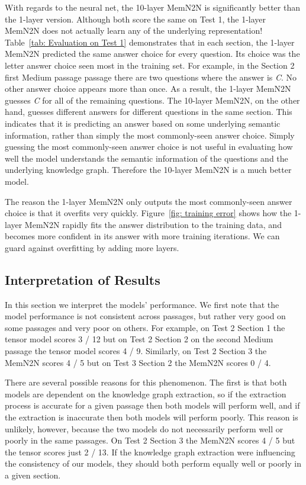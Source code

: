 \documentclass[pageno]{jpaper}
\begin{document}
With regards to the neural net, the 10-layer MemN2N is significantly better than
the 1-layer version. Although both score the same on Test 1, the 1-layer MemN2N
does not actually learn any of the underlying representation! Table~\ref{tab:
Evaluation on Test 1} demonstrates that in each section, the 1-layer MemN2N
predicted the same answer choice for every question. Its choice was the letter
answer choice seen most in the training set. For example, in the Section 2 first
Medium passage passage there are two questions where the answer is \textit{C}.
No other answer choice appears more than once. As a result, the 1-layer MemN2N
guesses \textit{C} for all of the remaining questions. The 10-layer MemN2N, on
the other hand, guesses different answers for different questions in the same
section. This indicates that it is predicting an answer based on some underlying
semantic information, rather than simply the most commonly-seen answer choice.
Simply guessing the most commonly-seen answer choice is not useful in evaluating
how well the model understands the semantic information of the questions and the
underlying knowledge graph. Therefore the 10-layer MemN2N is a much better
model.

The reason the 1-layer MemN2N only outputs the most commonly-seen answer choice
is that it overfits very quickly. Figure~\ref{fig: training error} shows how the
1-layer MemN2N rapidly fits the answer distribution to the training data, and
becomes more confident in its answer with more training iterations. We can guard
against overfitting by adding more layers.

\subsection{Interpretation of Results}
\label{Interpretation of Results}

In this section we interpret the models' performance. We first note that the
model performance is not consistent across passages, but rather very good on
some passages and very poor on others. For example, on Test 2 Section 1 the
tensor model scores 3 / 12 but on Test 2 Section 2 on the second Medium passage
the tensor model scores 4 / 9. Similarly, on Test 2 Section 3 the MemN2N scores
4 / 5 but on Test 3 Section 2 the MemN2N scores 0 / 4.

There are several possible reasons for this phenomenon. The first is that both
models are dependent on the knowledge graph extraction, so if the extraction
process is accurate for a given passage then both models will perform well, and
if the extraction is inaccurate then both models will perform poorly. This
reason is unlikely, however, because the two models do not necessarily perform
well or poorly in the same passages. On Test 2 Section 3 the MemN2N scores 4 / 5
but the tensor scores just 2 / 13. If the knowledge graph extraction were
influencing the consistency of our models, they should both perform equally well
or poorly in a given section.
\end{document}
